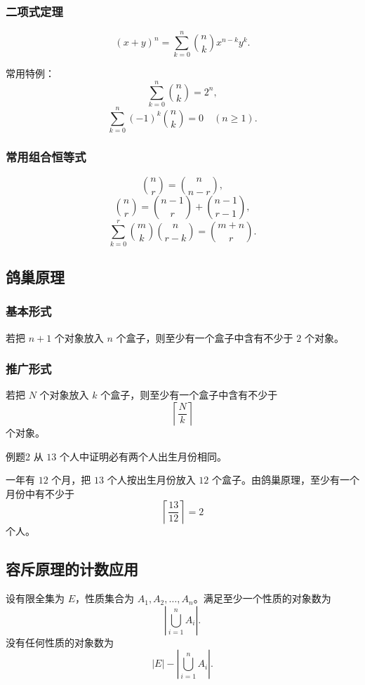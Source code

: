 \subsubsection{二项式定理}

\[
(x+y)^n=\sum_{k=0}^{n}\binom nk x^{n-k}y^k.
\]

常用特例：
\[
\sum_{k=0}^{n}\binom nk=2^n,
\]
\[
\sum_{k=0}^{n}(-1)^k\binom nk=0\quad(n\ge1).
\]

\subsubsection{常用组合恒等式}

\[
\binom nr=\binom n{n-r},
\]
\[
\binom nr=\binom{n-1}r+\binom{n-1}{r-1},
\]
\[
\sum_{k=0}^{r}\binom mk\binom n{r-k}=\binom{m+n}r.
\]

\subsection{鸽巢原理}

\subsubsection{基本形式}

若把 \(n+1\) 个对象放入 \(n\) 个盒子，则至少有一个盒子中含有不少于 \(2\) 个对象。

\subsubsection{推广形式}

若把 \(N\) 个对象放入 \(k\) 个盒子，则至少有一个盒子中含有不少于
\[
\left\lceil\frac Nk\right\rceil
\]
个对象。

\begin{question}{例题2}
	从 \(13\) 个人中证明必有两个人出生月份相同。
	
	\begin{solution}
	一年有 \(12\) 个月，把 \(13\) 个人按出生月份放入 \(12\) 个盒子。由鸽巢原理，至少有一个月份中有不少于
	\[
	\left\lceil\frac{13}{12}\right\rceil=2
	\]
	个人。
	\end{solution}
\end{question}

\subsection{容斥原理的计数应用}

设有限全集为 \(E\)，性质集合为 \(A_1,A_2,\dots,A_n\)。满足至少一个性质的对象数为
\[
\left|\bigcup_{i=1}^{n}A_i\right|.
\]
没有任何性质的对象数为
\[
|E|-\left|\bigcup_{i=1}^{n}A_i\right|.
\]

